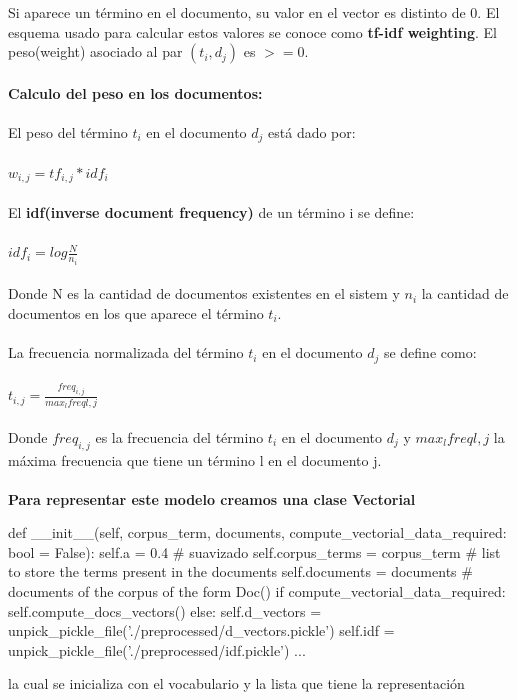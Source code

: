 \documentclass{llncs}
\begin{document}
\noindent
Si aparece un término en el documento, su valor 
en el vector es distinto de 0. El esquema usado para calcular estos valores se conoce como
\textbf{tf-idf weighting}. El peso(weight) asociado al par $(t_i, d_j)$ es $>=0$. 
\\\\
\noindent
\textbf{Calculo del peso en los documentos:}\\\\
\noindent
El peso del término \textbf{$t_i$} en el documento $d_j$ está dado por:\\
\\
$
    w_{i,j} = tf_{i,j}* idf_i
$
\\\\
El \textbf{idf(inverse document frequency)} de un término i se define:\\
\\
$
    idf_i = log{\frac{N}{n_i}}
$
\\\\
Donde N es la cantidad de documentos existentes en el sistem y $n_i$ la cantidad 
de documentos en los que aparece el término $t_i$.
\\\\
La frecuencia normalizada del término $t_i$ en el documento $d_j$ se define como:
\noindent\\\\
$
    t_{i,j} = \frac{freq_{i,j}}{max_lfreq{l,j}}
$
\\\\
Donde $freq_{i,j}$ es la frecuencia del término $t_i$ en el documento $d_j$ y
$max_lfreq{l,j}$ la máxima frecuencia que tiene un término l en el documento j.
\\\\
\noindent
\textbf{Para representar este modelo creamos una clase Vectorial} 
\\
\begin{python}
def __init__(self, corpus_term, documents, compute_vectorial_data_required: bool = False):
    self.a = 0.4 # suavizado
    self.corpus_terms = corpus_term # list to store the terms present in the documents
    self.documents = documents # documents of the corpus of the form Doc()
    if compute_vectorial_data_required:
        self.compute_docs_vectors()
    else:
        self.d_vectors = unpick_pickle_file('./preprocessed/d_vectors.pickle')
        self.idf = unpick_pickle_file('./preprocessed/idf.pickle')
    ...
\end{python}
\noindent
la cual se inicializa con el vocabulario y la lista que tiene la representación
\end{document}
